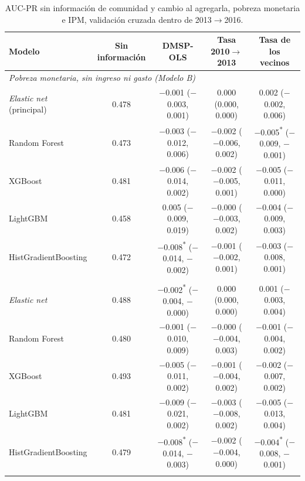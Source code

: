 \begin{table}[H]
  \centering
  \caption{AUC-PR sin información de comunidad y cambio al agregarla, pobreza monetaria
  e IPM, validación cruzada dentro de 2013$\to$2016.}
  \label{tab:robustez_techo}
  \footnotesize
  \setlength{\tabcolsep}{4pt}
  \begin{tabular}{l c ccc}
    \toprule
    \textbf{Modelo} & \textbf{Sin información} & \textbf{DMSP-OLS} & \textbf{Tasa 2010$\to$2013} & \textbf{Tasa de los vecinos} \\
    \midrule
    \multicolumn{5}{l}{\textit{Pobreza monetaria, sin ingreso ni gasto (Modelo B)}} \\
    \quad \emph{Elastic net} (principal) & 0.478 & $-$0.001 ($-$0.003, 0.001) & 0.000 (0.000, 0.000) & 0.002 ($-$0.002, 0.006) \\
    \quad Random Forest & 0.473 & $-$0.003 ($-$0.012, 0.006) & $-$0.002 ($-$0.006, 0.002) & $-$0.005\textsuperscript{*} ($-$0.009, $-$0.001) \\
    \quad XGBoost & 0.481 & $-$0.006 ($-$0.014, 0.002) & $-$0.002 ($-$0.005, 0.001) & $-$0.005 ($-$0.011, 0.000) \\
    \quad LightGBM & 0.458 & 0.005 ($-$0.009, 0.019) & $-$0.000 ($-$0.003, 0.002) & $-$0.004 ($-$0.009, 0.003) \\
    \quad HistGradientBoosting & 0.472 & $-$0.008\textsuperscript{*} ($-$0.014, $-$0.002) & $-$0.001 ($-$0.002, 0.001) & $-$0.003 ($-$0.008, 0.001) \\
    \addlinespace
    \multicolumn{5}{l}{\textit{Pobreza monetaria, con ingreso y gasto (Modelo A)}} \\
    \quad \emph{Elastic net} & 0.488 & $-$0.002\textsuperscript{*} ($-$0.004, $-$0.000) & 0.000 (0.000, 0.000) & 0.001 ($-$0.003, 0.004) \\
    \quad Random Forest & 0.480 & $-$0.001 ($-$0.010, 0.009) & $-$0.000 ($-$0.004, 0.003) & $-$0.001 ($-$0.004, 0.002) \\
    \quad XGBoost & 0.493 & $-$0.005 ($-$0.011, 0.002) & $-$0.001 ($-$0.004, 0.002) & $-$0.002 ($-$0.007, 0.002) \\
    \quad LightGBM & 0.481 & $-$0.009 ($-$0.021, 0.002) & $-$0.003 ($-$0.008, 0.002) & $-$0.005 ($-$0.013, 0.004) \\
    \quad HistGradientBoosting & 0.479 & $-$0.008\textsuperscript{*} ($-$0.014, $-$0.003) & $-$0.002 ($-$0.004, 0.000) & $-$0.004\textsuperscript{*} ($-$0.008, $-$0.001) \\
    \addlinespace
    \multicolumn{5}{l}{\textit{IPM, sin ingreso ni gasto (Modelo B)}} \\

\end{tabular}
\end{table}

